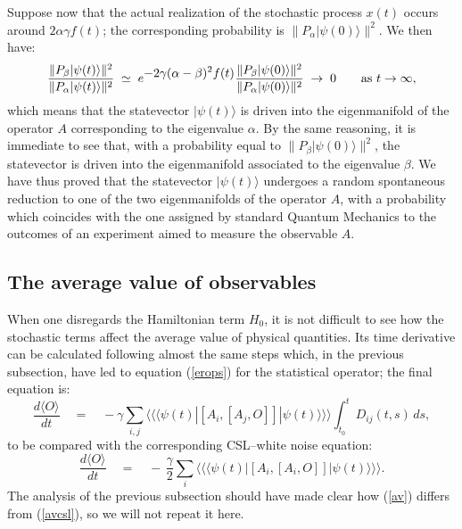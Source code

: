 \documentclass[10pt,a4paper]{article}
\newcommand{\llangle}{\langle\!\langle}
\newcommand{\rrangle}{\rangle\!\rangle}
\begin{document}
Suppose now that the actual realization of the stochastic process
$x(t)$ occurs around $2\alpha\gamma f(t)$; the corresponding
probability is $\|P_{\alpha} |\psi(0)\rangle \|^{2}$. We then
have:
\begin{equation}
\frac{\|P_{\beta} |\psi(t)\rangle \|^{2}}{\|P_{\alpha}
|\psi(t)\rangle \|^{2}} \; \simeq \; e^{\displaystyle
-2\gamma(\alpha - \beta)^{2} f(t)} \frac{\|P_{\beta}
|\psi(0)\rangle \|^{2}}{\|P_{\alpha} |\psi(0)\rangle \|^{2}} \;
\rightarrow \; 0 \qquad \makebox{as $t \rightarrow \infty$},
\end{equation}
which means that the statevector $|\psi(t)\rangle$ is driven into
the eigenmanifold of the operator $A$ corresponding to the
eigenvalue $\alpha$. By the same reasoning, it is immediate to see
that, with a probability equal to $\|P_{\beta} |\psi(0)\rangle
\|^{2}$, the statevector is driven into the eigenmanifold
associated to the eigenvalue $\beta$. We have thus proved that the
statevector $|\psi(t)\rangle$  undergoes a random spontaneous
reduction to one of the two eigenmanifolds of the operator
$A$, with a probability which coincides with the one assigned by
standard Quantum Mechanics to the outcomes of an experiment aimed
to measure the observable $A$.

\subsection{The average value of observables} \label{nsec4}

When one disregards the Hamiltonian term $H_{0}$, it is not
difficult to see how the stochastic terms affect the average value
of physical quantities. Its time derivative can be calculated
following almost the same steps which, in the previous subsection,
have led to equation (\ref{erops}) for the statistical operator; the
final equation is:
\begin{equation} \label{av}
\frac{d\langle O\rangle}{dt} \quad  = \quad -\gamma \sum_{i,j}
\llangle \langle\psi(t)| \left[ A_{i},\left[ A_{j}, O
\right]\right] |\psi(t)\rangle \rrangle \int_{t_{0}}^{t}
D_{ij}(t,s)\, ds,
\end{equation}
to be compared with the corresponding CSL--white noise equation:
\begin{equation} \label{avcsl}
\frac{d\langle O\rangle}{dt} \quad  = \quad -\,\frac{\gamma}{2}
\sum_{i} \llangle \langle\psi(t)| \left[ A_{i},\left[ A_{i}, O
\right]\right] |\psi(t)\rangle \rrangle.
\end{equation}
The analysis of the previous subsection should have made clear how
(\ref{av}) differs from (\ref{avcsl}), so we will not repeat it
here.
\end{document}
